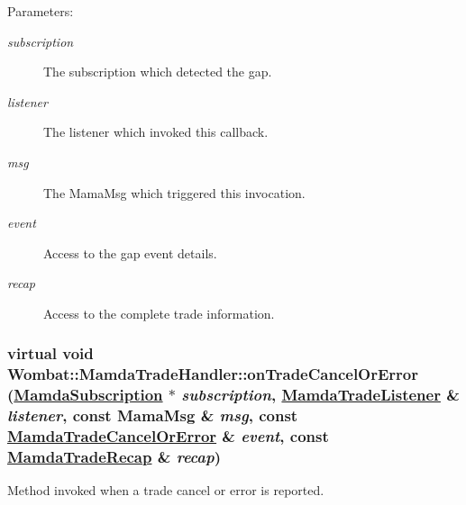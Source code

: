 \begin{Desc}
\item[Parameters:]
\begin{description}
\item[{\em subscription}]The subscription which detected the gap. \item[{\em listener}]The listener which invoked this callback. \item[{\em msg}]The Mama\-Msg which triggered this invocation. \item[{\em event}]Access to the gap event details. \item[{\em recap}]Access to the complete trade information. \end{description}
\end{Desc}
\hypertarget{classWombat_1_1MamdaTradeHandler_8be83b1075f878cd7dffc3f0127741e9}{
\subsubsection[onTradeCancelOrError]{\setlength{\rightskip}{0pt plus 5cm}virtual void Wombat::Mamda\-Trade\-Handler::on\-Trade\-Cancel\-Or\-Error (\hyperlink{classWombat_1_1MamdaSubscription}{Mamda\-Subscription} $\ast$ {\em subscription}, \hyperlink{classWombat_1_1MamdaTradeListener}{Mamda\-Trade\-Listener} \& {\em listener}, const Mama\-Msg \& {\em msg}, const \hyperlink{classWombat_1_1MamdaTradeCancelOrError}{Mamda\-Trade\-Cancel\-Or\-Error} \& {\em event}, const \hyperlink{classWombat_1_1MamdaTradeRecap}{Mamda\-Trade\-Recap} \& {\em recap})}}
\label{classWombat_1_1MamdaTradeHandler_8be83b1075f878cd7dffc3f0127741e9}


Method invoked when a trade cancel or error is reported. 

